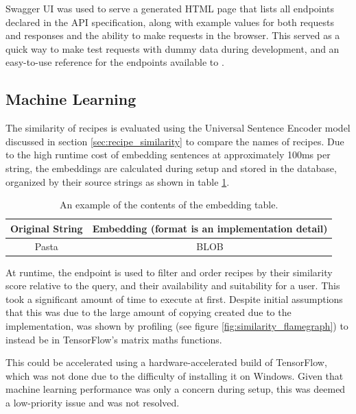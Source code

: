 Swagger UI \cite{smartbear_swagger_2024} was used to serve a generated HTML page that lists all endpoints declared in
the API specification, along with example values for both requests and responses and the ability to make requests in
the browser. This served as a quick way to make test requests with dummy data during development, and an easy-to-use
reference for the endpoints available to .

\subsection{Machine Learning}
The similarity of recipes is evaluated using the Universal Sentence Encoder model discussed in section \ref{sec:recipe_similarity} to
compare the names of recipes. Due to the high runtime cost of embedding sentences at approximately 100ms per string,
the embeddings are calculated during setup and stored in the database, organized by their source strings as shown in table \ref{fig:embedding_table}.

\begin{table}[h]
    \centering
    \caption{\label{fig:embedding_table}An example of the contents of the embedding table.}
    \begin{tabular}{cc}
        \toprule
        \textbf{Original String} & \textbf{Embedding (format is an implementation detail)} \\\midrule
        Pasta & BLOB \\\bottomrule
    \end{tabular}
\end{table}

At runtime, the  endpoint is used to filter and order recipes by their similarity score
relative to the query, and their availability and suitability for a user.
This took a significant amount of time to execute at first. Despite initial assumptions that this was due to the large amount of copying
created due to the implementation, was shown by profiling (see figure \ref{fig:similarity_flamegraph}) to instead be in TensorFlow's
matrix maths functions.

This could be accelerated using a hardware-accelerated build of TensorFlow, which was not done due to the difficulty of installing
it on Windows. Given that machine learning performance was only a concern during setup, this was deemed a low-priority
issue and was not resolved.

